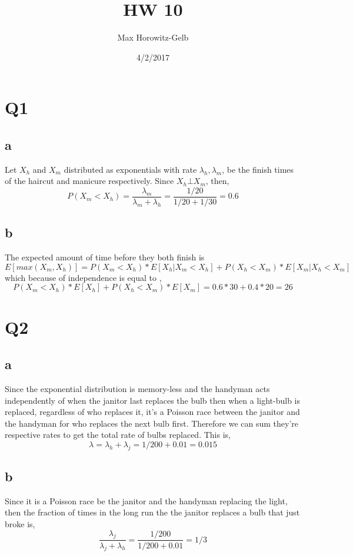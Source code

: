 \documentclass{article}
\title{HW 10}
\author{Max Horowitz-Gelb}
\date{4/2/2017}
\begin{document}
\maketitle

\section*{Q1}
\subsection*{a}
Let $X_h$ and $X_m$ distributed as exponentials with rate $\lambda_h, \lambda_m$, be the finish times  of the haircut and manicure respectively. 
Since $X_h \bot X_m$, then,
$$
P(X_m < X_h) = \frac{\lambda_m}{\lambda_m + \lambda_h} = \frac{1/20}{1/20 + 1/30} = 0.6
$$

\subsection*{b}
The expected amount of time before they both finish is 
$$
E[max(X_m, X_h)] = P(X_m < X_h) * E[X_h | X_m < X_h] + P(X_h < X_m) * E[X_m | X_h < X_m] 
$$
which because of independence is equal to ,
$$
P(X_m < X_h) * E[X_h] + P(X_h < X_m) * E[X_m] = 0.6 * 30 + 0.4 *20 =  26
$$

\section*{Q2}
\subsection*{a}
Since the exponential distribution is memory-less and the handyman acts independently of when the janitor last replaces the bulb then when a light-bulb is replaced, regardless of who replaces it, it's a Poisson race between the janitor and the handyman for who replaces the next bulb first. Therefore we can sum they're respective rates to get the total rate of bulbs replaced. 
This is,
$$
\lambda = \lambda_h + \lambda_j = 1/200 + 0.01 = 0.015
$$

\subsection*{b}
Since it is a Poisson race be the janitor and the handyman replacing the light, then the fraction of times in the long run the the janitor replaces a bulb that just broke is,
$$
\frac{\lambda_j}{\lambda_j + \lambda_h} = \frac{1/200}{1/200 + 0.01} = 1/3
$$
\end{document}
